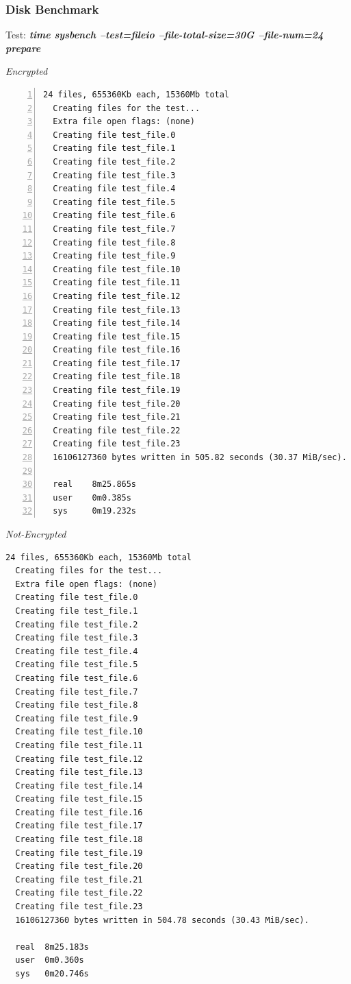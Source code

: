 \newpage
\subsubsection{Disk Benchmark}
\begin{center}
  Test: \textbf{\textit{time sysbench --test=fileio --file-total-size=30G --file-num=24 prepare}}  
\end{center}
\vspace*{-\baselineskip}
\noindent\begin{minipage}[t]{0.45\linewidth}
  \centering
  \textit{Encrypted}
  \lstset{language=bash,label=SliceExaple}
  \begin{lstlisting}[basicstyle=\tiny,frame=single, numbers=left, label=cpu_test1]
  24 files, 655360Kb each, 15360Mb total
  Creating files for the test...
  Extra file open flags: (none)
  Creating file test_file.0
  Creating file test_file.1
  Creating file test_file.2
  Creating file test_file.3
  Creating file test_file.4
  Creating file test_file.5
  Creating file test_file.6
  Creating file test_file.7
  Creating file test_file.8
  Creating file test_file.9
  Creating file test_file.10
  Creating file test_file.11
  Creating file test_file.12
  Creating file test_file.13
  Creating file test_file.14
  Creating file test_file.15
  Creating file test_file.16
  Creating file test_file.17
  Creating file test_file.18
  Creating file test_file.19
  Creating file test_file.20
  Creating file test_file.21
  Creating file test_file.22
  Creating file test_file.23
  16106127360 bytes written in 505.82 seconds (30.37 MiB/sec).
  
  real    8m25.865s
  user    0m0.385s
  sys     0m19.232s
  \end{lstlisting}
\end{minipage}
\hspace{0.5cm}
\noindent\begin{minipage}[t]{0.45\linewidth}
  \centering
  \textit{Not-Encrypted}
  \begin{lstlisting}[basicstyle=\tiny,frame=single, label=cpu_test2]
  24 files, 655360Kb each, 15360Mb total
  Creating files for the test...
  Extra file open flags: (none)
  Creating file test_file.0
  Creating file test_file.1
  Creating file test_file.2
  Creating file test_file.3
  Creating file test_file.4
  Creating file test_file.5
  Creating file test_file.6
  Creating file test_file.7
  Creating file test_file.8
  Creating file test_file.9
  Creating file test_file.10
  Creating file test_file.11
  Creating file test_file.12
  Creating file test_file.13
  Creating file test_file.14
  Creating file test_file.15
  Creating file test_file.16
  Creating file test_file.17
  Creating file test_file.18
  Creating file test_file.19
  Creating file test_file.20
  Creating file test_file.21
  Creating file test_file.22
  Creating file test_file.23
  16106127360 bytes written in 504.78 seconds (30.43 MiB/sec).
  
  real	8m25.183s
  user	0m0.360s
  sys	0m20.746s
    
  \end{lstlisting}
\end{minipage}

